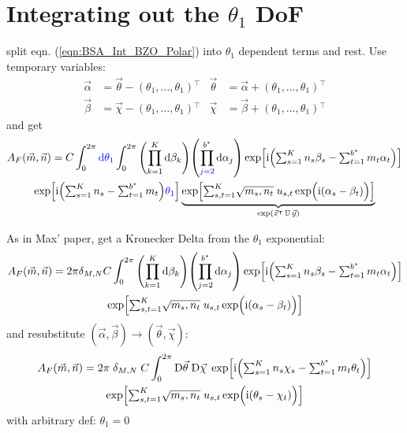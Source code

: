 \documentclass[
	english,
	a4paper,
	fontsize=10pt,
	parskip=half,
	titlepage=true,
	DIV=12,
	final
]{scrreprt}
\newcommand*{\transp}{\ensuremath{^\intercal}}
\newcommand*{\iunit}{\ensuremath{\mathrm{i}}}
\newcommand*{\DD}[1]{\ensuremath{\text{D}\vec{#1}\;}}
\begin{document}
\section{Integrating out the $\theta_1$ DoF}
split eqn. (\ref{eqn:BSA_Int_BZO_Polar}) into $\theta_1$ dependent terms and rest. Use temporary variables:
\begin{align}
	\vec{\alpha} &= \vec{\theta} - (\theta_1, \ldots, \theta_1)\transp
	&
	\vec{\theta} &= \vec{\alpha} + (\theta_1, \ldots, \theta_1)\transp
\\
	\vec{\beta } &= \vec{\chi  } - (\theta_1, \ldots, \theta_1)\transp
	&
	\vec{\chi  } &= \vec{\beta } + (\theta_1, \ldots, \theta_1)\transp
\end{align}
and get
\begin{multline}
	A_F(\vec{m}, \vec{n})
=
	C
	\int_{0}^{2\pi} {\color{blue} \dd{\theta_1}}
	\int_{0}^{2\pi}
		\qty( \prod_{k=1}               ^{K}   \dd{\beta_k} )
		\qty( \prod_{{\color{blue} j=2}}^{b^*} \dd{\alpha_j} )
			\exp[
				\iunit \qty(
				{\textstyle \sum_{s=1}^{K}   n_s \beta _s}   -
				{\textstyle \sum_{t=1}^{b^*} m_t \alpha_t}
			)]
\\
	\exp[
		\iunit \qty(
			{\textstyle \sum_{s=1}^{K}   n_s}   -
			{\textstyle \sum_{t=1}^{b^*} m_t}
		)
		{\color{blue} \theta_1}
	]
	\underbrace{
	\exp[
		{\textstyle \sum_{s,t=1}^{K} }
			\sqrt{m_s, n_t} \;
			u_{s,t}
			\exp(\Big. \iunit(\alpha_s - \beta_t) )
	]}_{\exp( \vec{x}\transp \, \mathbb{U} \, \vec{y})}
\end{multline}

As in Max' paper, get a Kronecker Delta from the $\theta_1$ exponential:
\begin{multline}	
	A_F(\vec{m}, \vec{n})
=
	2\pi \delta_{M,N} C
	\int_{0}^{2\pi}
		\qty( \prod_{k=1}^{K}   \dd{\beta _k} )
		\qty( \prod_{j=2}^{b^*} \dd{\alpha_j} )
	\exp[
		\iunit \qty(
		{\textstyle \sum_{s=1}^{K}   n_s \beta _s}   -
		{\textstyle \sum_{t=1}^{b^*} m_t \alpha_t}
	)]
\\
	\exp[
		{\textstyle \sum_{s,t=1}^{K} }
			\sqrt{m_s, n_t} \;
			u_{s,t}
			\exp(\Big. \iunit(\alpha_s - \beta_t) )
	]
\end{multline}
and resubstitute $(\vec{\alpha}, \vec{\beta}) \to (\vec{\theta}, \vec{\chi})$:
\begin{multline}	
	A_F(\vec{m}, \vec{n})
=
	2\pi \; \delta_{M,N} \; C
	\int_{0}^{2\pi}
		\DD{\theta} \DD{\chi}
	\exp[
		\iunit \qty(
		{\textstyle \sum_{s=1}^{K}   n_s \chi  _s}   -
		{\textstyle \sum_{t=1}^{b^*} m_t \theta_t}
	)]
\\
	\exp[
		{\textstyle \sum_{s,t=1}^{K} }
			\sqrt{m_s, n_t} \;
			u_{s,t}
			\exp(\Big. \iunit(\theta_s - \chi_t) )
	]
\end{multline}
with arbitrary def: $\theta_1 = 0$
\end{document}
